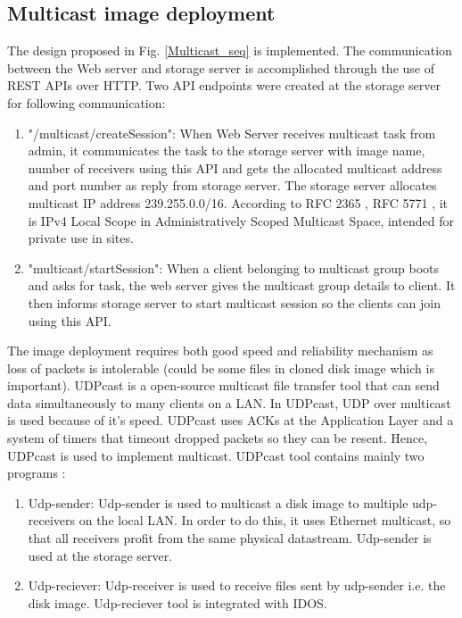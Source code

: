 \documentclass[a4paper,12pt]{article}
\begin{document}
\subsection{ Multicast image deployment}
The design proposed in Fig. \ref{Multicast_seq} is implemented. The communication between the Web server and storage server is accomplished through the use of REST APIs over HTTP. Two API endpoints were created at the storage server for following communication:
\begin{enumerate}
    \item "/multicast/createSession": When Web Server receives multicast task from admin, it communicates the task to the storage server with image name, number of receivers using this API and gets the allocated multicast address and port number as reply from storage server. The storage server allocates multicast IP address  239.255.0.0/16. According to RFC 2365 \cite{2365}, RFC 5771 \cite{5771}, it is IPv4 Local Scope in Administratively Scoped Multicast Space, intended for private use in sites. 
    \item "multicast/startSession": When a client belonging to multicast group boots and asks for task, the web server gives the multicast group details to client. It then informs storage server to start multicast session so the clients can join using this API.
\end{enumerate}

The image deployment requires both good speed and reliability mechanism as loss of packets is intolerable (could be some files in cloned disk image which is important). UDPcast \cite{udpcast} is a open-source multicast file transfer tool that can send data simultaneously to many clients on a LAN. In UDPcast, UDP over multicast is used because of it’s speed. UDPcast uses ACKs at the Application Layer and a system of timers that timeout dropped packets so they can be resent. Hence, UDPcast is used to implement multicast. 
UDPcast tool contains mainly two programs :
\begin{enumerate}

    \item Udp-sender: Udp-sender is used to  multicast a disk image to multiple udp-receivers on the local LAN. In order to do this, it uses Ethernet multicast, so that all receivers profit from the same physical datastream. Udp-sender is used at the storage server.
    \item Udp-reciever: Udp-receiver is used to receive files sent by udp-sender i.e. the disk image. Udp-reciever tool is integrated with IDOS. 
\end{enumerate}
\end{document}
